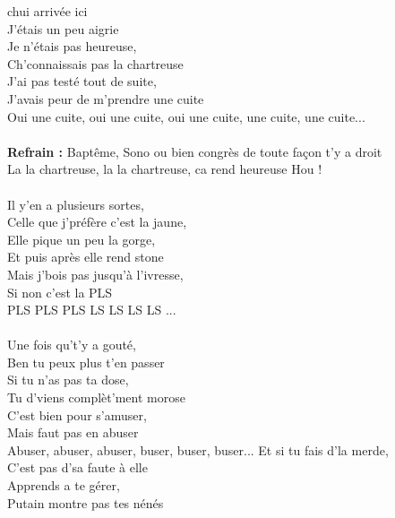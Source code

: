 
 chui arrivée ici
\\J'étais un peu aigrie
\\Je n'étais pas heureuse,
\\Ch'connaissais pas la chartreuse
\\J'ai pas testé tout de suite, 
\\J'avais peur de m'prendre une cuite
\\Oui une cuite, oui une cuite, oui une cuite, une cuite, une cuite...
\\\\\textbf{Refrain :}
{Baptême, Sono ou bien congrès de toute façon t'y a droit}
\\La la chartreuse, la la chartreuse, ca rend heureuse Hou !~~ \bissimple
\\\\Il y'en a plusieurs sortes, 
\\Celle que j'préfère c'est la jaune,
\\Elle pique un peu la gorge, 
\\Et puis après elle rend stone
\\Mais j'bois pas jusqu'à l'ivresse, 
\\Si non c'est la PLS
\\PLS PLS PLS LS LS LS LS ...
\\\\Une fois qu't'y a gouté, 
\\Ben tu peux plus t'en passer
\\Si tu n'as pas ta dose, 
\\Tu d'viens complèt'ment morose
\\C'est bien pour s'amuser, 
\\Mais faut pas en abuser
\\Abuser, abuser, abuser, buser, buser, buser...
\breakpage
Et si tu fais d'la merde, 
\\C'est pas d'sa faute à elle
\\Apprends a te gérer, 
\\Putain montre pas tes nénés
